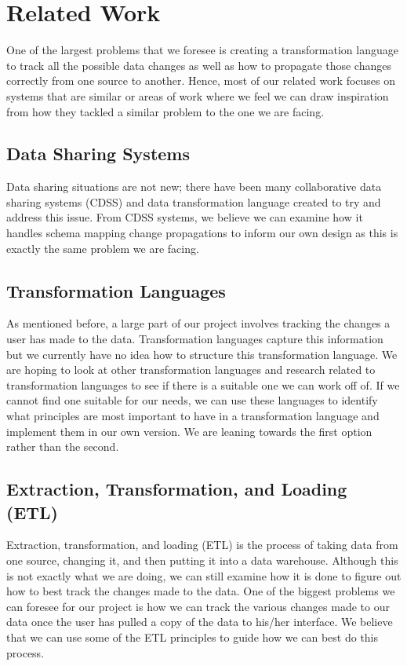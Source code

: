 \documentclass[12pt]{article}
\begin{document}
\section{Related Work}
One of the largest problems that we foresee is creating a transformation language to track all the possible data changes as well as how to propagate those changes correctly from one source to another. Hence, most of our related work focuses on systems that are similar or areas of work where we feel we can draw inspiration from how they tackled a similar problem to the one we are facing.

\subsection{Data Sharing Systems}
Data sharing situations are not new; there have been many collaborative data sharing systems (CDSS) \cite{ives2008orchestra, ives2005orchestra, karvounarakis2013collaborative}and data transformation language \cite{kandel2011wrangler, lakshmanan2001schemasql} created to try and address this issue. From CDSS systems, we believe we can examine how it handles schema mapping change propagations to inform our own design as this is exactly the same problem we are facing. 

\subsection{Transformation Languages}
As mentioned before, a large part of our project involves tracking the changes a user has made to the data. Transformation languages capture this information but we currently have no idea how to structure this transformation language. We are hoping to look at other transformation languages \cite{kandel2011wrangler, lakshmanan2001schemasql} and research related to transformation languages \cite{abiteboul1999tools, kandel2011wrangler, lakshmanan2001schemasql, raman2001potter} to see if there is a suitable one we can work off of. If we cannot find one suitable for our needs, we can use these languages to identify what principles are most important to have in a transformation language and implement them in our own version. We are leaning towards the first option rather than the second. 

\subsection{Extraction, Transformation, and Loading (ETL)}
Extraction, transformation, and loading (ETL) \cite{vassiliadis2009extraction} is the process of taking data from one source, changing it, and then putting it into a data warehouse. Although this is not exactly what we are doing, we can still examine how it is done to figure out how to best track the changes made to the data. One of the biggest problems we can foresee for our project is how we can track the various changes made to our data once the user has pulled a copy of the data to his/her interface. We believe that we can use some of the ETL principles to guide how we can best do this process.
\end{document}
